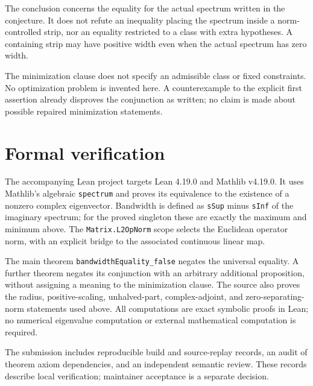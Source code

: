 \documentclass[11pt]{article}
\begin{document}
The conclusion concerns the equality for the actual spectrum written in
the conjecture. It does not refute an inequality placing the spectrum
inside a norm-controlled strip, nor an equality restricted to a class
with extra hypotheses. A containing strip may have positive width even
when the actual spectrum has zero width.

The minimization clause does not specify an admissible class or fixed
constraints. No optimization problem is invented here. A counterexample
to the explicit first assertion already disproves the conjunction as
written; no claim is made about possible repaired minimization statements.

\section{Formal verification}
The accompanying Lean project targets Lean 4.19.0 and Mathlib v4.19.0.
It uses Mathlib's algebraic \texttt{spectrum} and proves its equivalence
to the existence of a nonzero complex eigenvector. Bandwidth is defined
as \texttt{sSup} minus \texttt{sInf} of the imaginary spectrum; for the
proved singleton these are exactly the maximum and minimum above.
The \texttt{Matrix.L2OpNorm} scope selects the Euclidean operator norm,
with an explicit bridge to the associated continuous linear map.

The main theorem \texttt{bandwidthEquality\_false} negates the universal
equality. A further theorem negates its conjunction with an arbitrary
additional proposition, without assigning a meaning to the minimization
clause. The source also proves the radius, positive-scaling, unhalved-part,
complex-adjoint, and zero-separating-norm statements used above.
All computations are exact symbolic proofs in Lean; no numerical
eigenvalue computation or external mathematical computation is required.

The submission includes reproducible build and source-replay records,
an audit of theorem axiom dependencies, and an independent semantic
review. These records describe local verification; maintainer acceptance
is a separate decision.
\end{document}
